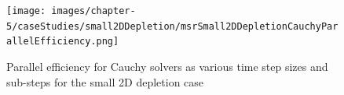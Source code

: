 \clearpage

\begin{figure}[p]
    \centering
    \texttt{[image: images/chapter-5/caseStudies/small2DDepletion/msrSmall2DDepletionCauchyParallelEfficiency.png]}
    \caption{Parallel efficiency for Cauchy solvers as various time step sizes and sub-steps for the small 2D depletion case}
    \label{fig:small_2D_depletion_cauchy_parallel_eff}
\end{figure}

\clearpage
